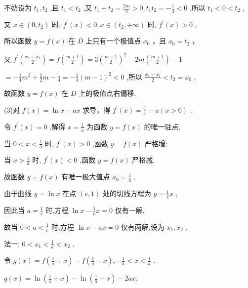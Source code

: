 \documentclass[10pt]{article}
\begin{document}
不妨设为 \({t}_{1},{t}_{2}\) ,且 \({t}_{1} < {t}_{2}\) ,又 \({t}_{1} + {t}_{2} = \frac{2m}{3} > 0,{t}_{1}{t}_{2} =  - \frac{1}{3} < 0\) ,所以 \({t}_{1} < 0 < {t}_{2}\) ,

又 \(x \in  \left( {0,{t}_{2}}\right)\) 时, \({f}^{\prime }\left( x\right)  < 0,x \in  \left( {{t}_{2}, + \infty }\right)\) 时, \({f}^{\prime }\left( x\right)  > 0\) ,

所以函数 \(y = f\left( x\right)\) 在 \(D\) 上只有一个极值点 \({x}_{0}\) ，且 \({x}_{0} = {t}_{2}\) ，

又 \({f}^{\prime }\left( \frac{{x}_{1} + {x}_{2}}{2}\right)  = f\left( \frac{m + 1}{2}\right)  = 3{\left( \frac{m + 1}{2}\right) }^{2} - {2m}\left( \frac{m + 1}{2}\right)  - 1\)

\(=  - \frac{1}{4}{m}^{2} + \frac{1}{2}m - \frac{1}{4} =  - \frac{1}{4}{\left( m - 1\right) }^{2} < 0\) ,所以 \(\frac{{x}_{1} + {x}_{2}}{2} < {t}_{2} = {x}_{0}\) ,

故函数 \(y = f\left( x\right)\) 在 \(D\) 上的极值点右偏移.

(3)对 \(f\left( x\right)  = \ln x - {ax}\) 求导，得 \({f}^{\prime }\left( x\right)  = \frac{1}{x} - a\left( {x > 0}\right)\) .

令 \({f}^{\prime }\left( x\right)  = 0\) ,解得 \(x = \frac{1}{a}\) 为函数 \(y = f\left( x\right)\) 的唯一驻点.

当 \(0 < x < \frac{1}{a}\) 时, \({f}^{\prime }\left( x\right)  > 0\) ,函数 \(y = f\left( x\right)\) 严格增;

当 \(x > \frac{1}{a}\) 时, \({f}^{\prime }\left( x\right)  < 0\) ,函数 \(y = f\left( x\right)\) 严格减,

故函数 \(y = f\left( x\right)\) 有唯一极大值点 \({x}_{0} = \frac{1}{a}\) .

由于曲线 \(y = \ln x\) 在点 \(\left( {e,1}\right)\) 处的切线方程为 \(y = \frac{1}{e}x\) ,

因此当 \(a = \frac{1}{e}\) 时,方程 \(\ln x - \frac{1}{e}x = 0\) 仅有一解,

故当 \(0 < a < \frac{1}{e}\) 时,方程 \(\ln x - {ax} = 0\) 仅有两解,设为 \({x}_{1},{x}_{2}\) .

法一: \(0 < {x}_{1} < \frac{1}{a} < {x}_{2}\) .

令 \(g\left( x\right)  = f\left( {\frac{1}{a} + x}\right)  - f\left( {\frac{1}{a} - x}\right) , - \frac{1}{a} < x < \frac{1}{a}\) .

\(g\left( x\right)  = \ln \left( {\frac{1}{a} + x}\right)  - \ln \left( {\frac{1}{a} - x}\right)  - {2ax},\)
\end{document}
